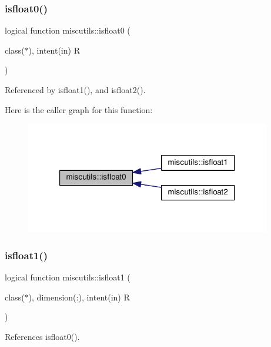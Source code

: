\mbox{\label{namespacemiscutils_a87ddeac831600aa6b24f14468911d710}} 
\subsubsection{\texorpdfstring{isfloat0()}{isfloat0()}}
{\footnotesize\ttfamily logical function miscutils\+::isfloat0 (\begin{DoxyParamCaption}\item[{class($\ast$), intent(in)}]{R }\end{DoxyParamCaption})}



Referenced by isfloat1(), and isfloat2().

Here is the caller graph for this function\+:
\nopagebreak
\begin{figure}[H]
\begin{center}
\leavevmode
\includegraphics[width=304pt]{namespacemiscutils_a87ddeac831600aa6b24f14468911d710_icgraph}
\end{center}
\end{figure}
\mbox{\label{namespacemiscutils_af3d292afdf769b0ef58f6cf1f6f0145d}} 
\subsubsection{\texorpdfstring{isfloat1()}{isfloat1()}}
{\footnotesize\ttfamily logical function miscutils\+::isfloat1 (\begin{DoxyParamCaption}\item[{class($\ast$), dimension(\+:), intent(in)}]{R }\end{DoxyParamCaption})}



References isfloat0().

